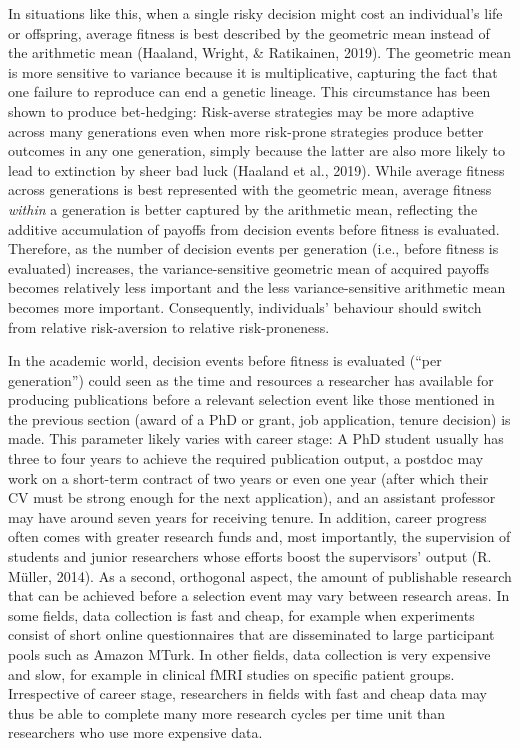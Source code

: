 \documentclass[
  ,man,mask,floatsintext]{apa6}
\begin{document}
In situations like this, when a single risky decision might cost an individual's life or offspring, average fitness is best described by the geometric mean instead of the arithmetic mean (Haaland, Wright, \& Ratikainen, 2019).
The geometric mean is more sensitive to variance because it is multiplicative, capturing the fact that one failure to reproduce can end a genetic lineage.
This circumstance has been shown to produce bet-hedging:
Risk-averse strategies may be more adaptive across many generations even when more risk-prone strategies produce better outcomes in any one generation, simply because the latter are also more likely to lead to extinction by sheer bad luck (Haaland et al., 2019).
While average fitness across generations is best represented with the geometric mean, average fitness \emph{within} a generation is better captured by the arithmetic mean, reflecting the additive accumulation of payoffs from decision events before fitness is evaluated.
Therefore, as the number of decision events per generation (i.e., before fitness is evaluated) increases, the variance-sensitive geometric mean of acquired payoffs becomes relatively less important and the less variance-sensitive arithmetic mean becomes more important.
Consequently, individuals' behaviour should switch from relative risk-aversion to relative risk-proneness.

In the academic world, decision events before fitness is evaluated (``per generation'') could seen as the time and resources a researcher has available for producing publications before a relevant selection event like those mentioned in the previous section (award of a PhD or grant, job application, tenure decision) is made.
This parameter likely varies with career stage:
A PhD student usually has three to four years to achieve the required publication output, a postdoc may work on a short-term contract of two years or even one year (after which their CV must be strong enough for the next application), and an assistant professor may have around seven years for receiving tenure.
In addition, career progress often comes with greater research funds and, most importantly, the supervision of students and junior researchers whose efforts boost the supervisors' output (R. Müller, 2014).
As a second, orthogonal aspect, the amount of publishable research that can be achieved before a selection event may vary between research areas.
In some fields, data collection is fast and cheap, for example when experiments consist of short online questionnaires that are disseminated to large participant pools such as Amazon MTurk.
In other fields, data collection is very expensive and slow, for example in clinical fMRI studies on specific patient groups.
Irrespective of career stage, researchers in fields with fast and cheap data may thus be able to complete many more research cycles per time unit than researchers who use more expensive data.
\end{document}
